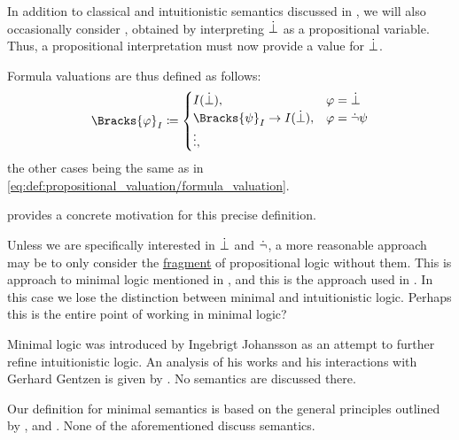 \begin{definition}\label{def:minimal_propositional_semantics}\mimprovised
  In addition to classical and intuitionistic semantics discussed in , we will also occasionally consider , obtained by interpreting \( \dot\bot \) as a propositional variable. Thus, a propositional interpretation must now provide a value for \( \dot\bot \).

  Formula valuations are thus defined as follows:
  \begin{equation}\label{eq:def:minimal_propositional_semantics/formula_valuation}
    \Bracks{\varphi}_I \coloneqq \begin{cases}
      I(\synbot),                             &\varphi = \synbot \\
      \Bracks{\psi}_I \rightarrow I(\synbot), &\varphi = \synneg \psi \\
      \vdots, &
    \end{cases}
  \end{equation}
  the other cases being the same as in \eqref{eq:def:propositional_valuation/formula_valuation}.
\end{definition}
\begin{comments}
  \item {} provides a concrete motivation for this precise definition.
  \item Unless we are specifically interested in \( \dot\bot \) and \( \dot\neg \), a more reasonable approach may be to only consider the \hyperref[def:propositional_syntax/fragment]{fragment} of propositional logic without them. This is approach to minimal logic mentioned in , and this is the approach used in . In this case we lose the distinction between minimal and intuitionistic logic. Perhaps this is the entire point of working in minimal logic?
  \item Minimal logic was introduced by Ingebrigt Johansson as an attempt to further refine intuitionistic logic. An analysis of his works and his interactions with Gerhard Gentzen is given by . No semantics are discussed there.
  \item Our definition for minimal semantics is based on the general principles outlined by ,  and . None of the aforementioned discuss semantics.
\end{comments}

